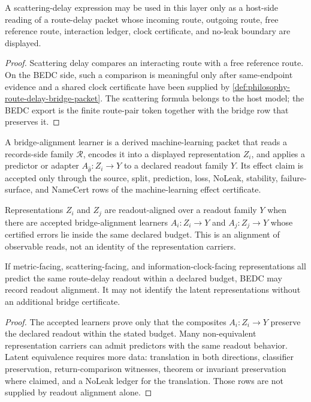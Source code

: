 \begin{corollary}
\label{cor:philosophy-scattering-delay-bridge-reading}
A scattering-delay expression may be used in this layer only as a
host-side reading of a route-delay packet whose incoming route, outgoing
route, free reference route, interaction ledger, clock certificate, and
no-leak boundary are displayed.
\end{corollary}
\begin{proof}
Scattering delay compares an interacting route with a free reference
route. On the BEDC side, such a comparison is meaningful only after
same-endpoint evidence and a shared clock certificate have been supplied
by \autoref{def:philosophy-route-delay-bridge-packet}. The scattering
formula belongs to the host model; the BEDC export is the finite
route-pair token together with the bridge row that preserves it.
\end{proof}

\begin{definition}
\label{def:philosophy-bridge-alignment-learner}
A bridge-alignment learner is a derived machine-learning packet that
reads a records-side family $\mathcal R$, encodes it into a displayed
representation $Z_i$, and applies a predictor or adapter
$A_{\hat\theta}:Z_i\to Y$ to a declared readout family $Y$. Its effect
claim is accepted only through the source, split, prediction, loss,
NoLeak, stability, failure-surface, and NameCert rows of the
machine-learning effect certificate.
\end{definition}

\begin{definition}
\label{def:philosophy-readout-alignment}
Representations $Z_i$ and $Z_j$ are readout-aligned over a readout
family $Y$ when there are accepted bridge-alignment learners
$A_i:Z_i\to Y$ and $A_j:Z_j\to Y$ whose certified errors lie inside the
same declared budget. This is an alignment of observable reads, not an
identity of the representation carriers.
\end{definition}

\begin{theorem}
\label{thm:philosophy-readout-alignment-not-latent-equivalence}
If metric-facing, scattering-facing, and information-clock-facing
representations all predict the same route-delay readout within a
declared budget, BEDC may record readout alignment. It may not identify
the latent representations without an additional bridge certificate.
\end{theorem}
\begin{proof}
The accepted learners prove only that the composites
$A_i:Z_i\to Y$ preserve the declared readout within the stated budget.
Many non-equivalent representation carriers can admit predictors with
the same readout behavior. Latent equivalence requires more data:
translation in both directions, classifier preservation, return-comparison
witnesses, theorem or invariant preservation where claimed, and a
NoLeak ledger for the translation. Those rows are not supplied by
readout alignment alone.
\end{proof}

